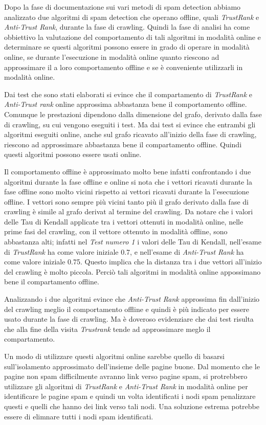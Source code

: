 Dopo la fase di documentazione sui vari metodi di spam detection abbiamo analizzato due algoritmi di spam detection che operano offline, quali \textit{TrustRank} e \textit{Anti-Trust Rank}, durante la fase di crawling. Quindi la fase di analisi ha come obbiettivo la valutazione del comportamento di tali algoritmi in modalità online e determinare se  questi algoritmi possono essere in grado di operare in modalità online, se durante l’esecuzione in modalità online quanto riescono ad approssimare il
a loro comportamento offline e se è conveniente utilizzarli in modalità online.

Dai test che sono stati elaborati si evince che il compartamento di \textit{TrustRank} e \textit{Anti-Trust rank} online approssima abbastanza bene il comportamento offline. Comunque le prestazioni dipendono dalla dimensione del grafo, derivato dalla fase di crawling, su cui vengono eseguiti i test. Ma dai test si evince che entrambi gli algoritmi eseguiti online, anche sul grafo ricavato all'inizio della fase di crawling, riescono ad approssimare abbastanza bene il compartamento offline. Quindi questi algoritmi possono essere usati online.

Il comportamento offline è approssimato molto bene infatti confrontando i due algoritmi durante la fase offline e online si nota che i vettori ricavati durante la fase offline sono molto vicini rispetto ai vettori ricavati durante la l'esecuzione offline. I vettori sono sempre più vicini tanto più il grafo derivato dalla fase di crawling è simile al grafo derivat al termine del crawling. Da notare che i valori delle Tau di Kendall applicate tra i vettori ottenuti in modalità online, nelle prime fasi del crawling, con il vettore ottenuto in modalità offline, sono abbastanza alti; infatti nel \textit{Test numero 1} i valori delle Tau di Kendall,  nell'esame di \textit{TrustRank} ha come valore iniziale 0.7, e nell'esame di \textit{Anti-Trust Rank} ha come valore iniziale 0.75. Questo implica che la distanza tra i due vettori all'inizio del crawling è molto piccola. Perciò tali algoritmi in modalità online appossimano bene il compartamento offline.

Analizzando i due algoritmi evince che \textit{Anti-Trust Rank} approssima fin dall'inizio del crawling meglio il comportamento offline e quindi è più indicato per essere usato durante la fase di crawling. Ma è doveroso evidenziare che dai test risulta che alla fine della visita \textit{Trustrank} tende ad approssimare meglo il compartamento.

Un modo di utilizzare questi algoritmi online sarebbe quello di basarsi sull'isolamento approssimato dell'insieme delle pagine buone. Dal momento che le pagine non spam difficilmente avranno link verso pagine spam, si protrebbero utilizzare gli algoritmi di \textit{TrustRank} e \textit{Anti-Trust Rank} in modalità online per identificare le pagine spam e quindi un volta identificati i nodi spam penalizzare questi e quelli che hanno dei link verso tali nodi. Una soluzione estrema potrebbe essere di elimnare tutti i nodi spam identificati.

